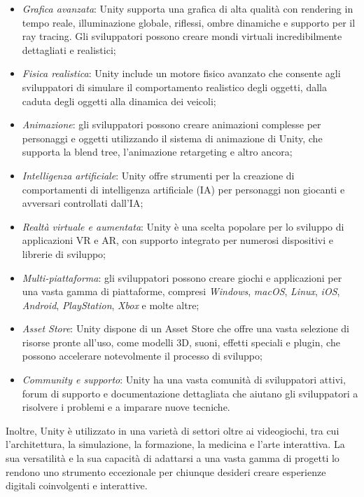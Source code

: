 \begin{itemize}
    \item \textit{Grafica avanzata}: Unity supporta una grafica di alta qualità con rendering in tempo reale, illuminazione globale, riflessi, ombre dinamiche e supporto per il ray tracing. Gli sviluppatori possono creare mondi virtuali incredibilmente dettagliati e realistici;
    \item \textit{Fisica realistica}: Unity include un motore fisico avanzato che consente agli sviluppatori di simulare il comportamento realistico degli oggetti, dalla caduta degli oggetti alla dinamica dei veicoli;
    \item \textit{Animazione}: gli sviluppatori possono creare animazioni complesse per personaggi e oggetti utilizzando il sistema di animazione di Unity, che supporta la blend tree, l'animazione retargeting e altro ancora;
    \item \textit{Intelligenza artificiale}: Unity offre strumenti per la creazione di comportamenti di intelligenza artificiale (IA) per personaggi non giocanti e avversari controllati dall'IA;
    \item \textit{Realtà virtuale e aumentata}: Unity è una scelta popolare per lo sviluppo di applicazioni VR e AR, con supporto integrato per numerosi dispositivi e librerie di sviluppo; 
    \item \textit{Multi-piattaforma}: gli sviluppatori possono creare giochi e applicazioni per una vasta gamma di piattaforme, compresi \textit{Windows}, \textit{macOS}, \textit{Linux}, \textit{iOS}, \textit{Android}, \textit{PlayStation}, \textit{Xbox} e molte altre;
    \item \textit{Asset Store}: Unity dispone di un Asset Store che offre una vasta selezione di risorse pronte all'uso, come modelli 3D, suoni, effetti speciali e plugin, che possono accelerare notevolmente il processo di sviluppo; 
    \item \textit{Community e supporto}: Unity ha una vasta comunità di sviluppatori attivi, forum di supporto e documentazione dettagliata che aiutano gli sviluppatori a risolvere i problemi e a imparare nuove tecniche.
\end{itemize}

Inoltre, Unity è utilizzato in una varietà di settori oltre ai videogiochi, tra cui l'architettura, la simulazione, la formazione, la medicina e l'arte interattiva. La sua versatilità e la sua capacità di adattarsi a una vasta gamma di progetti lo rendono uno strumento eccezionale per chiunque desideri creare esperienze digitali coinvolgenti e interattive.

